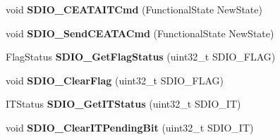 \begin{DoxyCompactItemize}
\item 
\hypertarget{group__SDIO__Exported__Functions_gab44b8cbc21be000a291563076159503b}{
void {\bfseries SDIO\_\-CEATAITCmd} (FunctionalState NewState)}
\label{group__SDIO__Exported__Functions_gab44b8cbc21be000a291563076159503b}

\item 
\hypertarget{group__SDIO__Exported__Functions_ga8dc7f17804bdb745b42f6647c8487b4c}{
void {\bfseries SDIO\_\-SendCEATACmd} (FunctionalState NewState)}
\label{group__SDIO__Exported__Functions_ga8dc7f17804bdb745b42f6647c8487b4c}

\item 
\hypertarget{group__SDIO__Exported__Functions_ga644514b4b3c95c5c4326d99cd166f6f9}{
FlagStatus {\bfseries SDIO\_\-GetFlagStatus} (uint32\_\-t SDIO\_\-FLAG)}
\label{group__SDIO__Exported__Functions_ga644514b4b3c95c5c4326d99cd166f6f9}

\item 
\hypertarget{group__SDIO__Exported__Functions_ga7aff4efdeb528229135f9f285e53518a}{
void {\bfseries SDIO\_\-ClearFlag} (uint32\_\-t SDIO\_\-FLAG)}
\label{group__SDIO__Exported__Functions_ga7aff4efdeb528229135f9f285e53518a}

\item 
\hypertarget{group__SDIO__Exported__Functions_ga2d64af1f3df0f99cb518f9a89bbd02ac}{
ITStatus {\bfseries SDIO\_\-GetITStatus} (uint32\_\-t SDIO\_\-IT)}
\label{group__SDIO__Exported__Functions_ga2d64af1f3df0f99cb518f9a89bbd02ac}

\item 
\hypertarget{group__SDIO__Exported__Functions_ga048e07fd86321cd01b2a22c071c3149b}{
void {\bfseries SDIO\_\-ClearITPendingBit} (uint32\_\-t SDIO\_\-IT)}
\label{group__SDIO__Exported__Functions_ga048e07fd86321cd01b2a22c071c3149b}

\end{DoxyCompactItemize}

